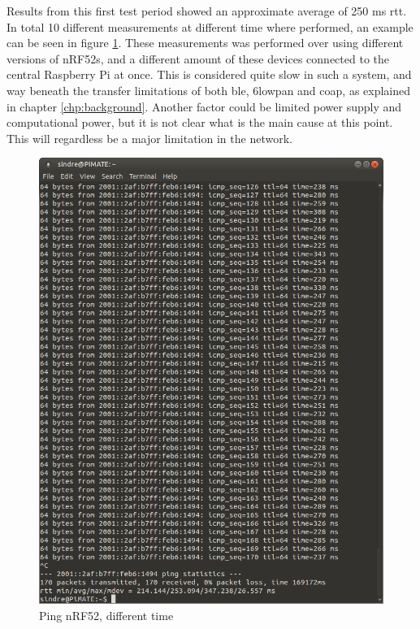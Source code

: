 \noindent Results from this first test period showed an approximate average of 250 ms \gls{rtt}. In total 10 different measurements at different time where performed, an example can be seen in figure \ref{fig:ping2}. These measurements was performed over using different versions of \glspl{nRF52}, and a different amount of these devices connected to the central Raspberry Pi at once. This is considered quite slow in such a system, and way beneath the transfer limitations of both \gls{ble}, \gls{6lowpan} and \gls{coap}, as explained in chapter \ref{chp:background}. Another factor could be limited power supply and computational power, but it is not clear what is the main cause at this point. This will regardless be a major limitation in the network. 


\begin{figure}[ht]
    \centering
    \includegraphics[scale=0.4]{ping3.png}    
    \caption{Ping nRF52, different time}
    \label{fig:ping2}
\end{figure}


